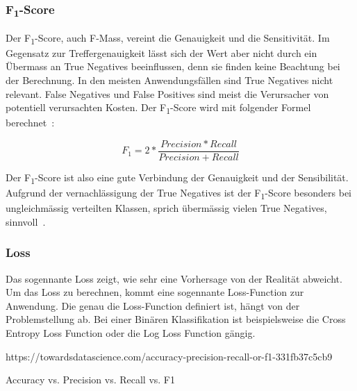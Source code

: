 \subsubsection{F\textsubscript{1}-Score}

Der F\textsubscript{1}-Score, auch F-Mass, vereint die Genauigkeit und die Sensitivität. Im Gegensatz zur Treffergenauigkeit lässt sich der Wert aber nicht durch ein Übermass an True Negatives beeinflussen, denn sie finden keine Beachtung bei der Berechnung. In den meisten Anwendungsfällen sind True Negatives nicht relevant. False Negatives und False Positives sind meist die Verursacher von potentiell verursachten Kosten. Der F\textsubscript{1}-Score wird mit folgender Formel berechnet~\autocite{TDSAccuracy}:

$$F_1=2 * \frac{Precision * Recall}{Precision + Recall}$$

Der F\textsubscript{1}-Score ist also eine gute Verbindung der Genauigkeit und der Sensibilität. Aufgrund der vernachlässigung der True Negatives ist der F\textsubscript{1}-Score besonders bei ungleichmässig verteilten Klassen, sprich übermässig vielen True Negatives, sinnvoll~\autocite{TDSAccuracy}.

\subsubsection{Loss}


Das sogennante Loss zeigt, wie sehr eine Vorhersage von der Realität abweicht. Um das Loss zu berechnen, kommt eine sogennante Loss-Function zur Anwendung. Die genau die Loss-Function definiert ist, hängt von der Problemstellung ab. Bei einer Binären Klassifikation ist beispielsweise die Cross Entropy Loss Function oder die Log Loss Function gängig. 




https://towardsdatascience.com/accuracy-precision-recall-or-f1-331fb37c5cb9

Accuracy vs. Precision vs. Recall vs. F1

